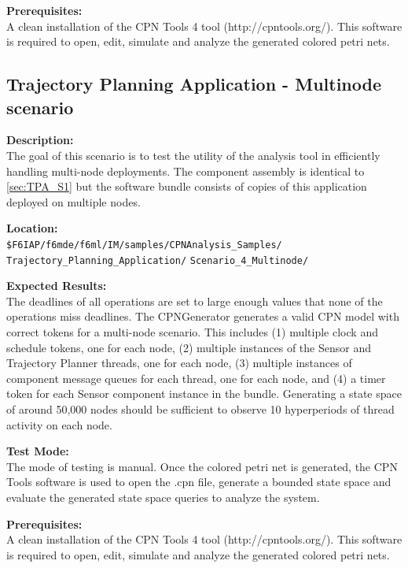 \noindent\textbf{Prerequisites:}\\
A clean installation of the CPN Tools 4 tool (http://cpntools.org/). This software is required to open, edit, simulate and analyze the generated colored petri nets. 

\subsection{Trajectory Planning Application - Multinode scenario}

\noindent\textbf{Description:}\\
The goal of this scenario is to test the utility of the analysis tool in efficiently handling multi-node deployments. The component assembly is identical to \ref{sec:TPA_S1} but the software bundle consists of copies of this application deployed on multiple nodes. 

\noindent\textbf{Location:}\\
\texttt{\$F6IAP/f6mde/f6ml/IM/samples/CPNAnalysis\_Samples/ \\ Trajectory\_Planning\_Application/}
\texttt{Scenario\_4\_Multinode/}

\noindent\textbf{Expected Results:}\\
The deadlines of all operations are set to large enough values that none of the operations miss deadlines. The CPNGenerator generates a valid CPN model with correct tokens for a multi-node scenario. This includes (1) multiple clock and schedule tokens, one for each node, (2) multiple instances of the Sensor and Trajectory Planner threads, one for each node, (3) multiple instances of component message queues for each thread, one for each node, and (4) a timer token for each Sensor component instance in the bundle. Generating a state space of around 50,000 nodes should be sufficient to observe 10 hyperperiods of thread activity on each node. 

\noindent\textbf{Test Mode:}\\
The mode of testing is manual. Once the colored petri net is generated, the CPN Tools software is used to open the .cpn file, generate a bounded state space and evaluate the generated state space queries to analyze the system.

\noindent\textbf{Prerequisites:}\\
A clean installation of the CPN Tools 4 tool (http://cpntools.org/). This software is required to open, edit, simulate and analyze the generated colored petri nets. 

